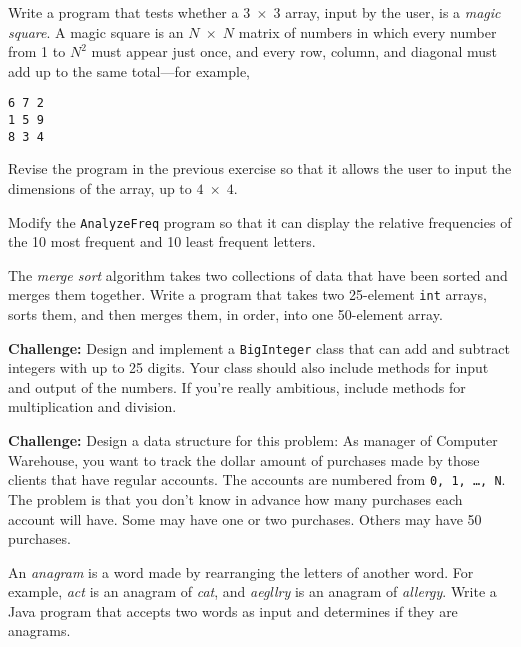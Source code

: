 \begin{EXRtwo}
\item  Write a program that tests whether
a $3\; \times \;3$ array, input by the user, is a {\it magic
square}. A magic square is an $N\; \times\; N$ matrix of
numbers in which every number from 1 to $N^2$ must appear just once,
and every row, column, and diagonal must add up to the same total---for example,

\begin{jjjlisting}
\begin{lstlisting}
6 7 2
1 5 9
8 3 4
\end{lstlisting}
\end{jjjlisting}

\item  Revise the program in the previous exercise so that
it allows the user to input the dimensions of the array,
up to $4\; \times\; 4$.

\item Modify the {\tt AnalyzeFreq} program so that it can display the
relative frequencies of the 10 most frequent and 10 least frequent
letters.

\item  The {\it merge sort} algorithm takes two collections
of data that have been sorted and merges them together.  Write a
program that takes two 25-element {\tt int} arrays, sorts them, and
then merges them, in order, into one 50-element array.

\item  {\bf Challenge: } Design and implement a {\tt BigInteger}
class that can add and subtract integers with up to 25 digits.   Your
class should also include methods for input and output of the
numbers.  If you're really ambitious, include methods for
multiplication and division.

\item  {\bf Challenge: } Design a data structure
for this problem: As manager of Computer Warehouse, you want to
track the dollar amount of purchases made by those clients that
have regular accounts.   The accounts are numbered from {\tt 0, 1, \dots ,
N}. The problem is that you don't know in advance how many purchases
each account will have.  Some may have one or two purchases.  Others
may have 50 purchases.

\item  An {\it anagram} is a word made by rearranging the
letters of another word.  For example, {\it act} is an
anagram of {\it cat}, and {\it aegllry} is an anagram of
{\it allergy}. Write a Java program that accepts two
words as input and determines if they are anagrams.


\end{EXRtwo}
